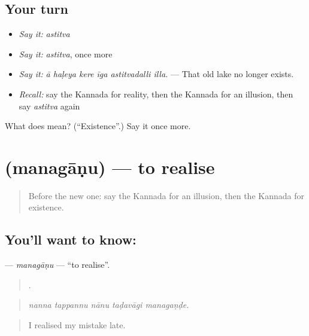 \subsection*{Your turn}
\begin{itemize}
\raggedright
  \item \emph{Say it:} \emph{astitva}
  \item \emph{Say it:} \emph{astitva}, once more
  \item \emph{Say it:} \emph{ā haḷeya kere īga astitvadalli illa.} — That old lake no longer exists.
  \item \emph{Recall:} say the Kannada for reality, then the Kannada for an illusion, then say \emph{astitva} again
\end{itemize}

\begin{tcolorbox}[breakable,colback=teal!4,colframe=teal!35!black,title={Before you move on}]
What does  mean? (\textquotedblleft{}Existence\textquotedblright{}.) Say it once more.
\end{tcolorbox}
\section[\texorpdfstring{\kn{ಮನಗಾಣು} (managāṇu)}{ಮನಗಾಣು (managāṇu)}]{ (managāṇu) — to realise}

\label{lesson:KA-C382-managanu}



\begin{quote}
Before the new one: say the Kannada for an illusion, then the Kannada for existence.
\end{quote}

\subsection*{You'll want to know: }
\textbf{} — \emph{managāṇu} — \textquotedblleft{}to realise\textquotedblright{}.

\begin{quote}
    .
\end{quote}

\begin{quote}
\emph{nanna tappannu nānu taḍavāgi managaṇḍe.}
\end{quote}

\begin{quote}
I realised my mistake late.
\end{quote}

